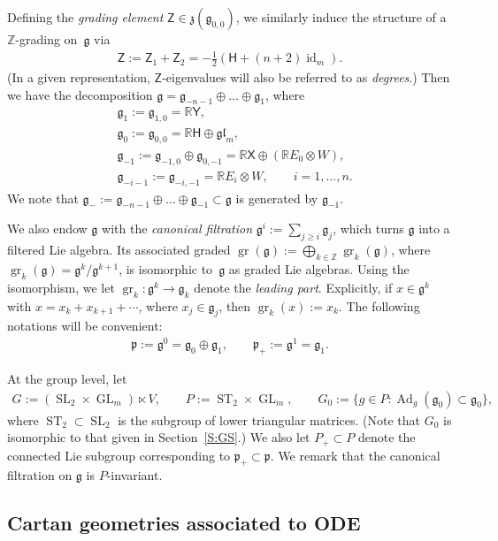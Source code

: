 \documentclass[10pt,a4paper]{amsart}
\newcommand\tensor{\otimes}
\newcommand\ST{\operatorname{ST}}
\DeclareMathOperator{\gr}{gr}
\DeclareMathOperator{\id}{id}
\newcommand\GL{\operatorname{GL}}
\newcommand{\g}{\mathfrak{g}}
\newcommand{\gl}{\mathfrak{gl}}
\newcommand\Ad{\operatorname{Ad}}
\renewcommand\gr{\operatorname{gr}}
\newcommand\fg{\mathfrak{g}}
\newcommand\fp{\mathfrak{p}}
\newcommand\fz {\mathfrak{z}}
\newcommand{\R}{\mathbb{R}}
\newcommand{\Z}{\mathbb{Z}}
\newcommand\SL{\operatorname{SL}}
\newcommand\sfX{\mathsf{X}}
\newcommand\sfH{\mathsf{H}}
\newcommand\sfY{\mathsf{Y}}
\newcommand\sfZ{\mathsf{Z}}
\numberwithin{equation}{section}
\begin{document}
Defining the {\em grading element} $\sfZ \in \fz(\g_{0,0})$, we similarly induce the structure of a $\Z$-grading on~$\g$ via
\begin{align*}%
\sfZ := \sfZ_1 + \sfZ_2 = -\frac{1}{2} (\sfH + (n+2)\id_m ).
\end{align*}
(In a given representation, $\sfZ$-eigenvalues will also be referred to as {\em degrees}.) Then we have the decomposition
$\g = \g_{-n-1} \oplus \dots \oplus \g_1$, where
\begin{align*}
 &\g_1 := \g_{1,0} =\R \sfY, \\
 &\g_0 := \g_{0,0}=\R \sfH \oplus \gl_m,\\
 &\g_{-1} := \g_{-1,0} \oplus \g_{0,-1} = \R \sfX \oplus (\R E_0 \tensor W),\\
 &\g_{-i-1} := \g_{-i,-1} = \R E_i \tensor W, \qquad i = 1,\dots, n.
\end{align*}
We note that $\g_- := \g_{-n-1} \oplus \dots \oplus \g_{-1} \subset \g$ is generated by $\g_{-1}$.

We also endow $\g$ with the {\em canonical filtration} $\g^{i} := \sum_{j \ge i}\g_{j}$, which turns $\g$ into a filtered Lie algebra. Its associated graded $\gr(\g) := \bigoplus_{k \in \Z} \gr_k(\g)$, where $\gr_k(\g) = \g^k/\g^{k +1}$, is isomorphic to~$\g$ as graded Lie algebras. Using the isomorphism, we let $\gr_k\colon \g^k \to \g_k$ denote the {\em leading part}. Explicitly, if $x \in \g^k$ with $x=x_k + x_{k+1} + \cdots$, where $x_j \in \g_j$, then $\gr_k(x) := x_k$. The following notations will be convenient:
 \begin{align*}
 \fp:= \g^{0} = \fg_0 \oplus \fg_1, \qquad
 \fp_{+}:= \g^{1} = \fg_1.
 \end{align*}


At the group level, let
 \begin{align*}
 G := (\SL_2 \times \GL_m) \ltimes V, \qquad
 P := \ST_2 \times \GL_m, \qquad
 G_0 := \{ g \in P\colon \Ad_g (\g_0) \subset \g_0 \},
 \end{align*}
where $\ST_2 \subset \SL_2$ is the subgroup of lower triangular matrices. (Note that $G_0$ is isomorphic to that given in Section~\ref{S:GS}.) We also let $P_+ \subset P$ denote the connected Lie subgroup corresponding to $\fp_+ \subset \fp$. We remark that the canonical filtration on $\fg$ is $P$-invariant.

\subsection{Cartan geometries associated to ODE} \label{S:CG}
\end{document}
